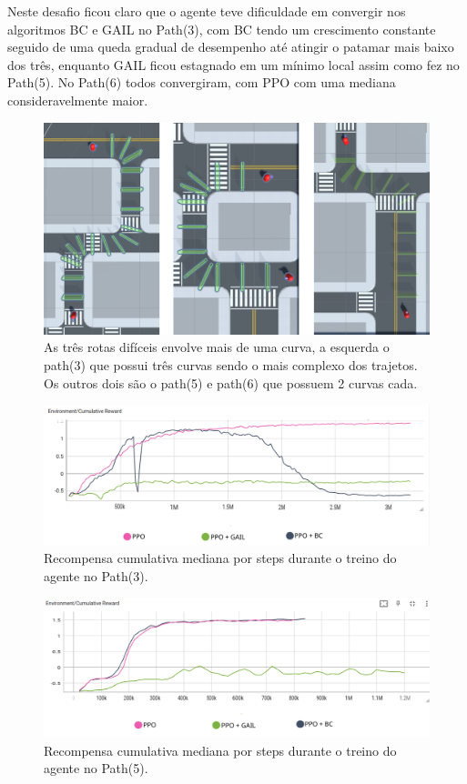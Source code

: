 Neste desafio ficou claro que o agente teve dificuldade em convergir nos algoritmos BC e GAIL no Path(3), com BC tendo um crescimento constante seguido de uma queda gradual de desempenho até atingir o patamar mais baixo dos três, enquanto GAIL ficou estagnado em um mínimo local assim como fez no Path(5). No Path(6) todos convergiram, com PPO com uma mediana consideravelmente maior.

\begin{figure}[h]
    \centering
    \includegraphics{figs/treinos/desafio-dificil/rotas.png}
    \caption{As três rotas difíceis envolve mais de uma curva, a esquerda o path(3) que possui três curvas sendo o mais complexo dos trajetos. Os outros dois são o path(5) e path(6) que possuem 2 curvas cada.}
\end{figure}

\begin{figure}[h]
    \centering
    \includegraphics[scale=0.35]{figs/treinos/desafio-dificil/path-3_recompensas-algos.png}
    \caption{Recompensa cumulativa mediana por steps durante o treino do agente no Path(3).}
\end{figure}

\begin{figure}[h]
    \centering
    \includegraphics[scale=0.35]{figs/treinos/desafio-dificil/path-5_recompensas-algos.png}
    \caption{Recompensa cumulativa mediana por steps durante o treino do agente no Path(5).}
\end{figure}

